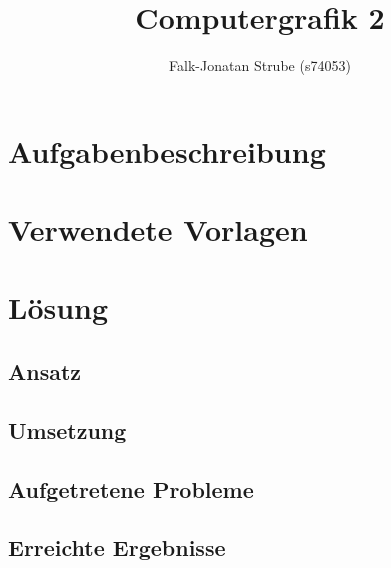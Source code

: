 \documentclass{scrreprt}
\title{Computergrafik 2}
\author{Falk-Jonatan Strube (s74053)}
\begin{document}
\maketitle
\tableofcontents

\chapter{Aufgabenbeschreibung}
\chapter{Verwendete Vorlagen}
\cite{Strube2017yt}
\cite{Strube2017web}
\cite{Wiebusch2017}
\cite{cgtextures2017}
\cite{Autodesk2017}

\chapter{Lösung}
\section{Ansatz}

\section{Umsetzung}

\section{Aufgetretene Probleme}
\section{Erreichte Ergebnisse}




\renewcommand{\emph}[1]{\textit{#1}}
\newpage
\printbibliography
\end{document}
